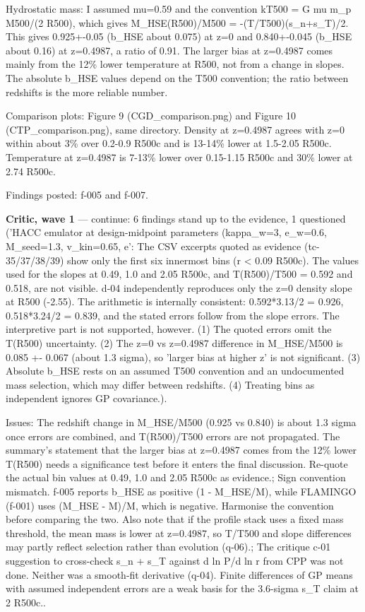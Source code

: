 \documentclass[11pt,a4paper]{article}
\begin{document}
Hydrostatic mass: I assumed mu=0.59 and the convention kT500 = G mu m\_p M500/(2 R500), which gives M\_HSE(R500)/M500 = -(T/T500)(s\_n+s\_T)/2. This gives 0.925+-0.05 (b\_HSE about 0.075) at z=0 and 0.840+-0.045 (b\_HSE about 0.16) at z=0.4987, a ratio of 0.91. The larger bias at z=0.4987 comes mainly from the 12\% lower temperature at R500, not from a change in slopes. The absolute b\_HSE values depend on the T500 convention; the ratio between redshifts is the more reliable number.

Comparison plots: Figure 9 (CGD\_comparison.png) and Figure 10 (CTP\_comparison.png), same directory. Density at z=0.4987 agrees with z=0 within about 3\% over 0.2-0.9 R500c and is 13-14\% lower at 1.5-2.05 R500c. Temperature at z=0.4987 is 7-13\% lower over 0.15-1.15 R500c and 30\% lower at 2.74 R500c.

Findings posted: f-005 and f-007.

\textbf{Critic, wave 1} --- continue: 6 findings stand up to the evidence, 1 questioned ('HACC emulator at design-midpoint parameters (kappa\_w=3, e\_w=0.6, M\_seed=1.3, v\_kin=0.65, e': The CSV excerpts quoted as evidence (tc-35/37/38/39) show only the first six innermost bins (r \textless{} 0.09 R500c). The values used for the slopes at 0.49, 1.0 and 2.05 R500c, and T(R500)/T500 = 0.592 and 0.518, are not visible. d-04 independently reproduces only the z=0 density slope at R500 (-2.55). The arithmetic is internally consistent: 0.592*3.13/2 = 0.926, 0.518*3.24/2 = 0.839, and the stated errors follow from the slope errors. The interpretive part is not supported, however. (1) The quoted errors omit the T(R500) uncertainty. (2) The z=0 vs z=0.4987 difference in M\_HSE/M500 is 0.085 +- 0.067 (about 1.3 sigma), so 'larger bias at higher z' is not significant. (3) Absolute b\_HSE rests on an assumed T500 convention and an undocumented mass selection, which may differ between redshifts. (4) Treating bins as independent ignores GP covariance.).

Issues: The redshift change in M\_HSE/M500 (0.925 vs 0.840) is about 1.3 sigma once errors are combined, and T(R500)/T500 errors are not propagated. The summary's statement that the larger bias at z=0.4987 comes from the 12\% lower T(R500) needs a significance test before it enters the final discussion. Re-quote the actual bin values at 0.49, 1.0 and 2.05 R500c as evidence.; Sign convention mismatch. f-005 reports b\_HSE as positive (1 - M\_HSE/M), while FLAMINGO (f-001) uses (M\_HSE - M)/M, which is negative. Harmonise the convention before comparing the two. Also note that if the profile stack uses a fixed mass threshold, the mean mass is lower at z=0.4987, so T/T500 and slope differences may partly reflect selection rather than evolution (q-06).; The critique c-01 suggestion to cross-check s\_n + s\_T against d ln P/d ln r from CPP was not done. Neither was a smooth-fit derivative (q-04). Finite differences of GP means with assumed independent errors are a weak basis for the 3.6-sigma s\_T claim at 2 R500c..
\end{document}

